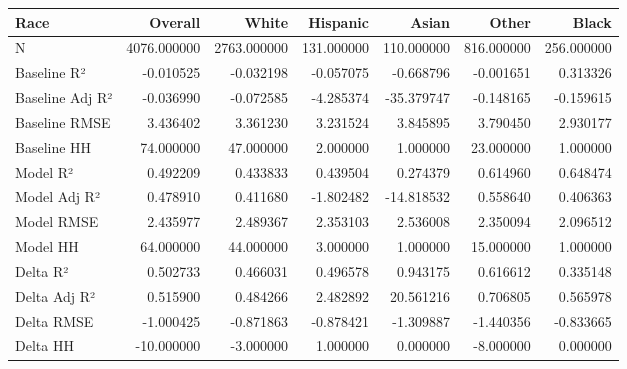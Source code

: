 \begin{tabular}{lrrrrrr}
\toprule
Race &      Overall &        White &    Hispanic &       Asian &       Other &       Black \\
\midrule
N               &  4076.000000 &  2763.000000 &  131.000000 &  110.000000 &  816.000000 &  256.000000 \\
Baseline R²     &    -0.010525 &    -0.032198 &   -0.057075 &   -0.668796 &   -0.001651 &    0.313326 \\
Baseline Adj R² &    -0.036990 &    -0.072585 &   -4.285374 &  -35.379747 &   -0.148165 &   -0.159615 \\
Baseline RMSE   &     3.436402 &     3.361230 &    3.231524 &    3.845895 &    3.790450 &    2.930177 \\
Baseline HH     &    74.000000 &    47.000000 &    2.000000 &    1.000000 &   23.000000 &    1.000000 \\
Model R²        &     0.492209 &     0.433833 &    0.439504 &    0.274379 &    0.614960 &    0.648474 \\
Model Adj R²    &     0.478910 &     0.411680 &   -1.802482 &  -14.818532 &    0.558640 &    0.406363 \\
Model RMSE      &     2.435977 &     2.489367 &    2.353103 &    2.536008 &    2.350094 &    2.096512 \\
Model HH        &    64.000000 &    44.000000 &    3.000000 &    1.000000 &   15.000000 &    1.000000 \\
Delta R²        &     0.502733 &     0.466031 &    0.496578 &    0.943175 &    0.616612 &    0.335148 \\
Delta Adj R²    &     0.515900 &     0.484266 &    2.482892 &   20.561216 &    0.706805 &    0.565978 \\
Delta RMSE      &    -1.000425 &    -0.871863 &   -0.878421 &   -1.309887 &   -1.440356 &   -0.833665 \\
Delta HH        &   -10.000000 &    -3.000000 &    1.000000 &    0.000000 &   -8.000000 &    0.000000 \\
\bottomrule
\end{tabular}
